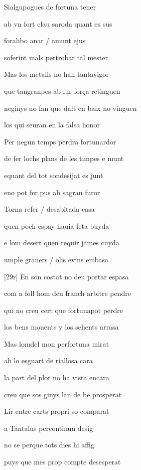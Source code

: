 \documentclass[12pt]{article}
\begin{document}
\begin{estrofa}

 Sialgupogues de fortuna tener

 ab vn fort clau saroda quant es sus

 foralibo anar / amunt ejus

 soferint mals pertrobar tal mester

 Mas los metalls no han tantavigor

 que tangranpes ab lur for\c{c}a retinguen

 neginys no fan que dalt en baix no vinguen

 los qui seuran en la falsa honor

\end{estrofa}



\begin{estrofa}

 Per negun temps perdra fortunardor

 de fer lochs plans de les timpes e munt

 equant del tot sondesijat es junt

 eno pot fer pus ab sagran furor

 Torna refer / desabitada casa

 quen poch espay hauia feta buyda

 e lom desert quen requir james cuyda

 umple graners / olis evins embasa

\end{estrofa}



\begin{estrofa}

 [29r] En son costat no deu portar espasa

 com a foll hom deu franch arbitre pendre

 qui no creu cert que fortunapot perdre

 los bens mouents y los sehents arrasa

 Mas lomdel mon perfortuna mirat

 ab lo esguart de riallosa cara

 la part del plor no ha vista encara

 creu que sos ginys lan de be prosperat

\end{estrofa}



\begin{estrofa}

 Lir entre carts propri so comparat

 a Tantalus percontinuu desig

 no se perque tots dies hi affig

 puys que mes prop compte desesperat

\end{estrofa}
\end{document}
